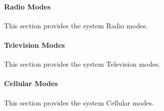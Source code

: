 \paragraph{Radio Modes}
\label{loc:HeavyRadioModes}

This section provides the system Radio modes.




\paragraph{Television Modes}
\label{loc:HeavyTVModes}

This section provides the system Television modes.




\paragraph{Cellular Modes}
\label{loc:HeavyCellModes}

This section provides the system Cellular modes.

